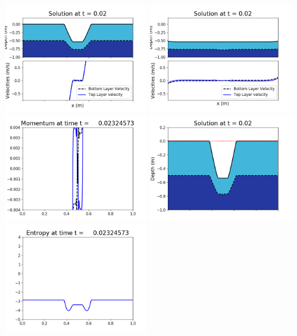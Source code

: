 \documentclass[11pt]{article}
\begin{document}
\vskip 10pt 
\includegraphics[width=0.475\textwidth]{frame0067fig1001.png}
\includegraphics[width=0.475\textwidth]{frame0067fig1002.png}
\vskip 10pt 
\includegraphics[width=0.475\textwidth]{frame0067fig1003.png}
\includegraphics[width=0.475\textwidth]{frame0067fig1006.png}
\vskip 10pt 
\includegraphics[width=0.475\textwidth]{frame0067fig1007.png}
\end{document}
